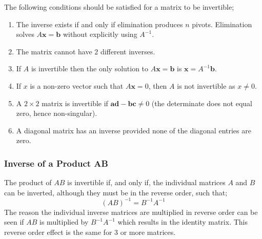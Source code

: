         \par \hfill \break
        The following conditions should be satisfied for a matrix to be invertible;
        \begin{enumerate}
            \item The inverse exists if and only if elimination produces \(n\) pivots. Elimination solves
                \(A\boldsymbol{x} = \boldsymbol{b}\) without explicitly using \(A^{-1}\).
            \item The matrix cannot have 2 different inverses.
            \item If \(A\) is invertible then the only solution to \(A \boldsymbol{x} = \boldsymbol{b}\) is 
                \(\boldsymbol{x} = A^{-1}\boldsymbol{b}\).
            \item If \(x\) is a non-zero vector such that \(A\boldsymbol{x} = 0\), then \(A\) is not invertible as 
                \(x \neq 0\).
            \item A \(2 \times 2\) matrix is invertible if \(\boldsymbol{ad}-\boldsymbol{bc} \neq 0\) 
                (the determinate does not equal zero, hence non-singular).
            \item A diagonal matrix has an inverse provided none of the diagonal entries are zero.
        \end{enumerate}

        \subsubsection{Inverse of a Product AB}
            The product of \(AB\) is invertible if, and only if, the individual matrices \(A\) and \(B\) can be 
            inverted, although they must be in the reverse order, such that;
            \begin{equation}
                (AB)^{-1} = B^{-1} A^{-1}
            \end{equation}
            The reason the individual inverse matrices are multiplied in reverse order can be seen if \(AB\) is 
            multiplied by \(B^{-1} A^{-1}\) which results in the identity matrix. This reverse order effect is the 
            same for 3 or more matrices.

